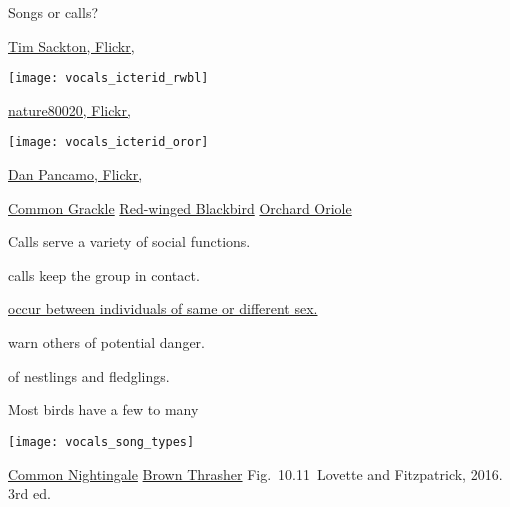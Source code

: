 \documentclass[t]{beamer}
\newcommand{\cornell}[1]{Fig.~#1~Lovette and Fitzpatrick, 2016. 3rd ed.}
\newcommand{\backskip}{\vspace{-0.5\baselineskip}}
\begin{document}
\begin{frame}{Songs or calls?}

\begin{multicols}{3}

\noindent{}

\tiny\href{https://www.flickr.com/photos/43581314@N08/33973682813}{Tim Sackton, Flickr, }

\columnbreak

\noindent\texttt{[image: vocals\_icterid\_rwbl]}

\centering

\href{https://www.flickr.com/photos/122259497@N03/14022247867}{nature80020, Flickr, }
\columnbreak


\noindent\texttt{[image: vocals\_icterid\_oror]}

\hfill \href{https://www.flickr.com/photos/10017367@N03/5611912358}{Dan Pancamo, Flickr, }


\end{multicols}


\vfilll

\tiny \href{https://macaulaylibrary.org/asset/133330}{Common Grackle}
\hfill
\href{https://macaulaylibrary.org/asset/314523871}{Red-winged Blackbird}
\hfill
\href{https://macaulaylibrary.org/asset/94445}{Orchard Oriole}
\end{frame}


\begin{frame}{Calls serve a variety of social functions.}

\hangpara \href{https://youtu.be/oNKb8rIYCoQ}{} calls keep the group in contact.

\hangpara \href{https://youtu.be/j-2vQ5mg2vo}{ occur between individuals of same or different sex.}

\hangpara \href{https://youtu.be/l_w_3AbkuV0?t=46}{} warn others of potential danger.

\hangpara {} of nestlings and fledglings.

\end{frame}


\begin{frame}{Most birds have a few to many }

\backskip

\centering

\texttt{[image: vocals\_song\_types]}

\vfilll

\tiny \href{https://youtu.be/pdMrd5-vbf4}{Common Nightingale} 
\quad 
\href{https://youtu.be/erdU5AIYbNk}{Brown Thrasher}
\hfill
\cornell{10.11}

\end{frame}
\end{document}
